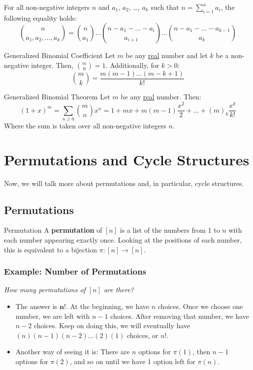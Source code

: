 \documentclass[letterpaper]{article}
\begin{document}
\begin{theorem}{}{}
    For all non-negative integers $n$ and $a_1$, $a_2$, \dots, $a_k$ such that $n = \sum_{i = 1}^n a_i$, the following equality holds:
    \[\binom{n}{a_1,a_2,\dots,a_k} = \binom{n}{a_1}\dots\binom{n - a_1 - \dots - a_i}{a_{i + 1}}\dots\binom{n - a_1 - \dots - a_{k - 1}}{a_k}\]
\end{theorem}

\begin{definition}{Generalized Binomial Coefficient}{}
    Let $m$ be any \underline{real} number and let $k$ be a non-negative integer. Then, $\binom{m}{0} = 1$. Additionally, for $k > 0$:
    \[\binom{m}{k} = \frac{m(m - 1)\dots(m - k + 1)}{k!}\]
\end{definition}

\begin{theorem}{Generalized Binomial Theorem}{}
    Let $m$ be any \underline{real} number. Then:
    \[(1 + x)^m = \sum_{n \geq 0} \binom{m}{n} x^n = 1 + mx + m(m - 1)\frac{x^2}{2} + \dots + (m)_k \frac{x^k}{k!}\]
    Where the sum is taken over all non-negative integers $n$.
\end{theorem}








\newpage 
\section{Permutations and Cycle Structures}
Now, we will talk more about permutations and, in particular, cycle structures.

\subsection{Permutations}
\begin{definition}{Permutation}{}
    A \textbf{permutation} of $[n]$ is a list of the numbers from 1 to $n$ with each number appearing exactly once. Looking at the positions of each number, this is equivalent to a bijection $\pi: [n] \to [n]$.  
\end{definition}

\subsubsection{Example: Number of Permutations}
\emph{How many permutations of $[n]$ are there?}
\begin{itemize}
    \item The answer is $\mathbf{n!}$. At the beginning, we have $n$ choices. Once we choose one number, we are left with $n - 1$ choices. After removing that number, we have $n - 2$ choices. Keep on doing this, we will eventually have $(n)(n - 1)(n - 2) \dots (2)(1)$ choices, or $n!$. 
    \item Another way of seeing it is: There are $n$ options for $\pi(1)$, then $n - 1$ options for $\pi(2)$, and so on until we have 1 option left for $\pi(n)$.
\end{itemize}
\end{document}
